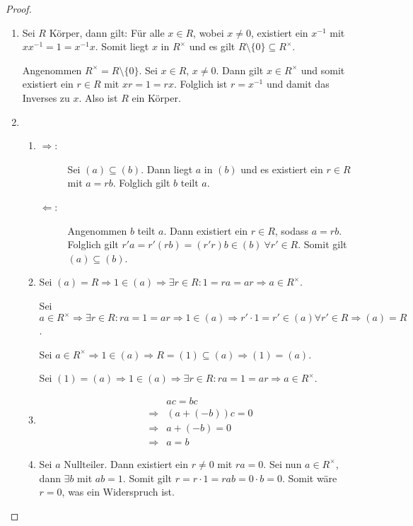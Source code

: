 \documentclass[12pt,a4paper]{scrartcl}
\begin{document}
\begin{proof}
	\leavevmode
	\begin{enumerate}
		\item Sei $R$ Körper, dann gilt: Für alle $x\in R$, wobei $x\neq 0$, existiert ein $x^{-1}$ mit $xx^{-1} = 1 =x^{-1}x$. Somit liegt $x$ in $R^{\times}$ und es gilt $R\setminus \{0\}\subseteq R^{\times}$.
		
		Angenommen $R^{\times} = R\setminus\{0\}$. Sei $x\in R$, $x\neq 0$. Dann gilt $x\in R^{\times}$ und somit existiert ein $r \in R$ mit $xr = 1 = rx$. Folglich ist $r = x^{-1}$ und damit das Inverses zu $x$. Also ist $R$ ein Körper.
		
		\item \begin{enumerate}
			\item 
				\begin{description}
					\item[\glqq $\Rightarrow$\grqq:] Sei $(a)\subseteq (b)$. Dann liegt $a$ in $(b)$ und es existiert ein $r\in R$ mit $a = rb$. Folglich gilt $b$ teilt $a$.
					
					\item[\glqq $\Leftarrow$\grqq:] Angenommen $b$ teilt $a$. Dann existiert ein $r\in R$, sodass $a =rb$. Folglich gilt $r'a = r'(rb) = (r'r)b\in (b)~\forall r'\in R$. Somit gilt $(a)\subseteq (b)$.
				\end{description}
				
			\item %
				Sei $(a) = R\Rightarrow 1\in (a)\Rightarrow \exists r\in R: 1 = ra = ar\Rightarrow a\in R^{\times}$.
			
				Sei $a\in R^{\times}\Rightarrow \exists r\in R: ra = 1 = ar\Rightarrow 1\in (a) \Rightarrow r'\cdot 1 = r'\in (a) \forall r'\in R \Rightarrow (a) = R$.
				
				Sei $a \in R^{\times}\Rightarrow 1\in (a) \Rightarrow R = (1) \subseteq (a) \Rightarrow (1)  = (a) $.
				
				Sei $(1) = (a) \Rightarrow1\in (a) \Rightarrow \exists r\in R: ra = 1 = ar\Rightarrow a\in R^{\times}$.
			\item 
				\begin{align*}
					&ac = bc \\
					\Rightarrow& (a+(-b))c = 0 \\
					\Rightarrow& a+(-b) = 0 \\
					\Rightarrow& a = b
				\end{align*}
			\item 
				Sei $a$ Nullteiler. Dann existiert ein $r\neq 0$ mit $ra = 0$. Sei nun $a\in R^{\times}$, dann $\exists b$ mit $ab = 1$. Somit gilt $r = r\cdot 1 = rab = 0 \cdot b = 0$. Somit wäre $r = 0$, was ein Widerspruch ist.
		\end{enumerate}
	\end{enumerate}
\end{proof}
\end{document}
